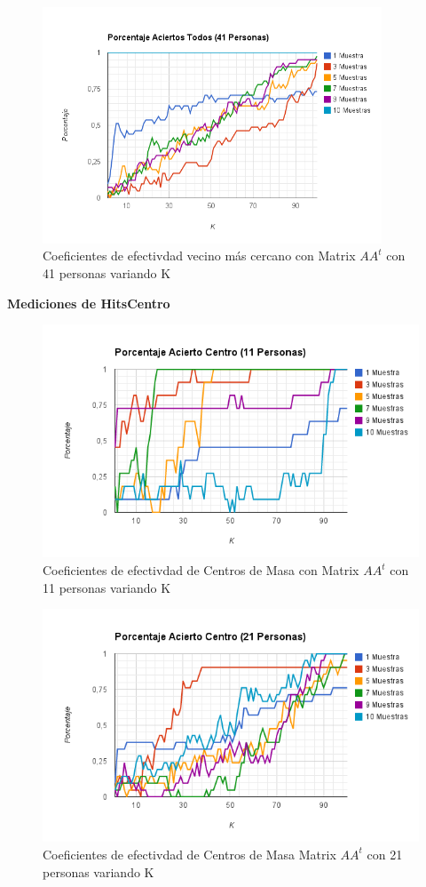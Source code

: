 \begin{figure}[H]
\includegraphics[width=0.9\textwidth]{img/imagel.png}
     \caption{Coeficientes de efectivdad vecino más cercano con Matrix $AA^t$ con 41 personas variando K}
\end{figure}

\textbf{Mediciones de HitsCentro}

\begin{figure}[H]
\includegraphics[width=1\textwidth]{img/imagem.png}
     \caption{Coeficientes de efectivdad de Centros de Masa con Matrix $AA^t$ con 11 personas variando K}
\end{figure}

\begin{figure}[H]
\includegraphics[width=1\textwidth]{img/imagen.png}
     \caption{Coeficientes de efectivdad de Centros de Masa Matrix $AA^t$ con 21 personas variando K}
\end{figure}

